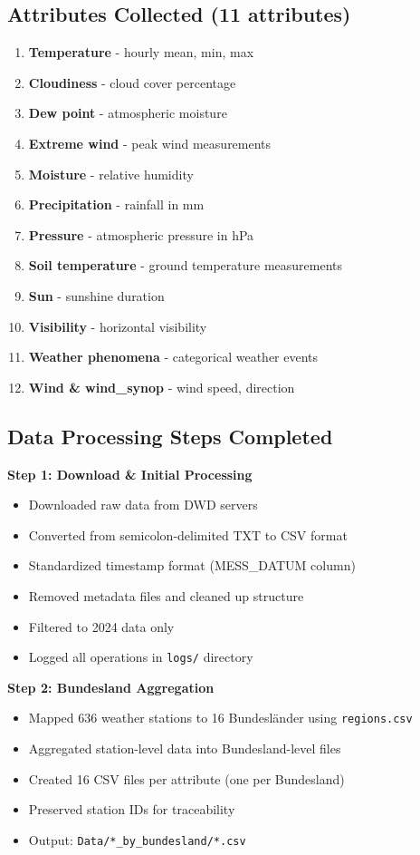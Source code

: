 \documentclass[11pt,a4paper]{article}
\begin{document}
\subsection{Attributes Collected (11 attributes)}
\begin{enumerate}
    \item \textbf{Temperature} - hourly mean, min, max
    \item \textbf{Cloudiness} - cloud cover percentage
    \item \textbf{Dew point} - atmospheric moisture
    \item \textbf{Extreme wind} - peak wind measurements
    \item \textbf{Moisture} - relative humidity
    \item \textbf{Precipitation} - rainfall in mm
    \item \textbf{Pressure} - atmospheric pressure in hPa
    \item \textbf{Soil temperature} - ground temperature measurements
    \item \textbf{Sun} - sunshine duration
    \item \textbf{Visibility} - horizontal visibility
    \item \textbf{Weather phenomena} - categorical weather events
    \item \textbf{Wind \& wind\_synop} - wind speed, direction
\end{enumerate}

\subsection{Data Processing Steps Completed}

\textbf{Step 1: Download \& Initial Processing}
\begin{itemize}
    \item Downloaded raw data from DWD servers
    \item Converted from semicolon-delimited TXT to CSV format
    \item Standardized timestamp format (MESS\_DATUM column)
    \item Removed metadata files and cleaned up structure
    \item Filtered to 2024 data only
    \item Logged all operations in \texttt{logs/} directory
\end{itemize}

\textbf{Step 2: Bundesland Aggregation}
\begin{itemize}
    \item Mapped 636 weather stations to 16 Bundesländer using \texttt{regions.csv}
    \item Aggregated station-level data into Bundesland-level files
    \item Created 16 CSV files per attribute (one per Bundesland)
    \item Preserved station IDs for traceability
    \item Output: \texttt{Data/*\_by\_bundesland/*.csv}
\end{itemize}
\end{document}

